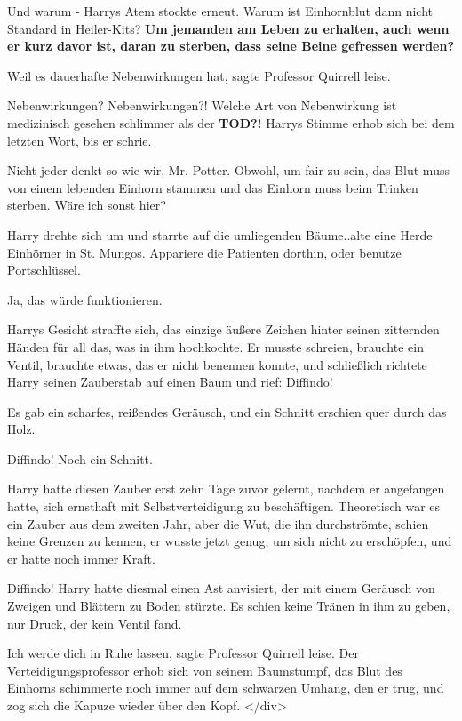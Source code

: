\glqq{}Und warum -\grqq{} Harrys Atem stockte erneut. \glqq{}Warum ist Einhornblut
dann nicht Standard in Heiler-Kits? \textbf{Um jemanden am Leben zu
erhalten, auch wenn er kurz davor ist, daran zu sterben, dass seine Beine
gefressen werden?}\grqq{}

\glqq{}Weil es dauerhafte Nebenwirkungen hat\grqq{}, sagte Professor Quirrell
leise.

\glqq{}Nebenwirkungen? Nebenwirkungen?! Welche Art von Nebenwirkung ist
medizinisch gesehen schlimmer als der \textbf{TOD?!}\grqq{} Harrys Stimme
erhob sich bei dem letzten Wort, bis er schrie.

\glqq{}Nicht jeder denkt so wie wir, Mr. Potter. Obwohl, um fair zu sein, das
Blut muss von einem lebenden Einhorn stammen und das Einhorn muss beim
Trinken sterben. Wäre ich sonst hier?\grqq{}

Harry drehte sich um und starrte auf die umliegenden Bäume.\grqq{}.alte eine
Herde Einhörner in St. Mungos. Appariere die Patienten dorthin, oder
benutze Portschlüssel.\grqq{}

\glqq{}Ja, das würde funktionieren.\grqq{}

Harrys Gesicht straffte sich, das einzige äußere Zeichen hinter seinen
zitternden Händen für all das, was in ihm hochkochte. Er musste schreien,
brauchte ein Ventil, brauchte etwas, das er nicht benennen konnte, und
schließlich richtete Harry seinen Zauberstab auf einen Baum und rief:
\glqq{}Diffindo!\grqq{}

Es gab ein scharfes, reißendes Geräusch, und ein Schnitt erschien quer durch das
Holz.

\glqq{}Diffindo!\grqq{} Noch ein Schnitt.

Harry hatte diesen Zauber erst zehn Tage zuvor gelernt, nachdem er angefangen
hatte, sich ernsthaft mit Selbstverteidigung zu beschäftigen. Theoretisch
war es ein Zauber aus dem zweiten Jahr, aber die Wut, die ihn
durchströmte, schien keine Grenzen zu kennen, er wusste jetzt genug, um
sich nicht zu erschöpfen, und er hatte noch immer Kraft.

\glqq{}Diffindo!\grqq{} Harry hatte diesmal einen Ast anvisiert, der mit einem
Geräusch von Zweigen und Blättern zu Boden stürzte. Es schien keine
Tränen in ihm zu geben, nur Druck, der kein Ventil fand.

\glqq{}Ich werde dich in Ruhe lassen\grqq{}, sagte Professor Quirrell leise. Der
Verteidigungsprofessor erhob sich von seinem Baumstumpf, das Blut des
Einhorns schimmerte noch immer auf dem schwarzen Umhang, den er trug, und
zog sich die Kapuze wieder über den Kopf. </div>